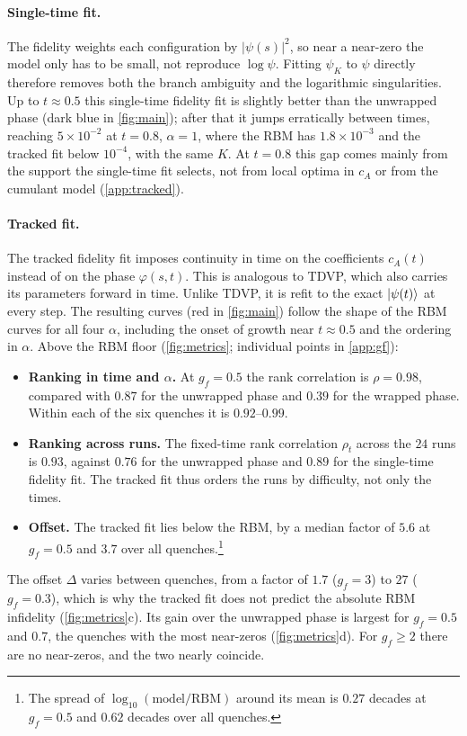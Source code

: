 \documentclass[11pt,a4paper]{article}
\newcommand{\tracked}{\textcolor{ctracked}{tracked fidelity fit}}
\newcommand{\fidfit}{\textcolor{cfid}{single-time fidelity fit}}
\begin{document}
\paragraph{Single-time fit.} The fidelity weights each configuration by $|\psi(s)|^2$, so near a near-zero the model only has to be small, not reproduce $\log\psi$. Fitting $\psi_K$ to $\psi$ directly therefore removes both the branch ambiguity and the logarithmic singularities. Up to $t\approx0.5$ this \fidfit{} is slightly better than the unwrapped phase (dark blue in \cref{fig:main}); after that it jumps erratically between times, reaching $5\times10^{-2}$ at $t=0.8$, $\alpha=1$, where the RBM has $1.8\times10^{-3}$ and the tracked fit below $10^{-4}$, with the same $K$. At $t=0.8$ this gap comes mainly from the support the single-time fit selects, not from local optima in $c_A$ or from the cumulant model (\cref{app:tracked}).

\paragraph{Tracked fit.}
 The \tracked{} imposes continuity in time on the coefficients $c_A(t)$ instead of on the phase $\varphi(s,t)$. This is analogous to TDVP, which also carries its parameters forward in time. Unlike TDVP, it is refit to the exact $\ket{\psi(t)}$ at every step. The resulting curves (red in \cref{fig:main}) follow the shape of the RBM curves for all four $\alpha$, including the onset of growth near $t\approx0.5$ and the ordering in $\alpha$. Above the RBM floor (\cref{fig:metrics}; individual points in \cref{app:gf}):
\begin{itemize}
  \item \textbf{Ranking in time and $\alpha$.} At $g_f=0.5$ the rank correlation is $\rho=0.98$, compared with $0.87$ for the unwrapped phase and $0.39$ for the wrapped phase. Within each of the six quenches it is $0.92$--$0.99$.
  \item \textbf{Ranking across runs.} The fixed-time rank correlation $\rho_t$ across the $24$ runs is $0.93$, against $0.76$ for the unwrapped phase and $0.89$ for the single-time fidelity fit. The tracked fit thus orders the runs by difficulty, not only the times.
  \item \textbf{Offset.} The tracked fit lies below the RBM, by a median factor of $5.6$ at $g_f=0.5$ and $3.7$ over all quenches.\footnote{The spread of $\log_{10}(\text{model}/\text{RBM})$ around its mean is $0.27$ decades at $g_f=0.5$ and $0.62$ decades over all quenches.}
\end{itemize}
The offset $\Delta$ varies between quenches, from a factor of $1.7$ ($g_f=3$) to $27$ ($g_f=0.3$), which is why the tracked fit does not predict the absolute RBM infidelity (\cref{fig:metrics}c). Its gain over the unwrapped phase is largest for $g_f=0.5$ and $0.7$, the quenches with the most near-zeros (\cref{fig:metrics}d). For $g_f\ge2$ there are no near-zeros, and the two nearly coincide.
\end{document}
